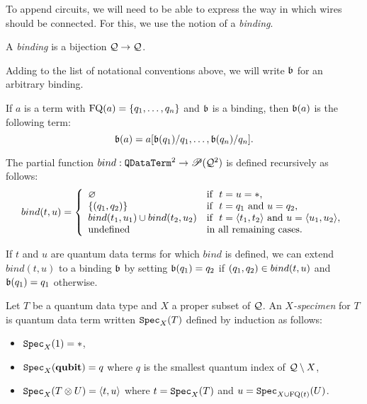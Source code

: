 \documentclass[twoside]{article}
\begin{document}
To append circuits, we will need to be able to express the way in 
which wires should be connected. For this, we use the notion of a 
\emph{binding}.

\begin{definition}
A \emph{binding} is a bijection $\mathcal{Q}\to \mathcal{Q}$.
\end{definition}


Adding to the list of notational conventions above, we will write 
$\mathfrak{b}$ for an arbitrary binding. 

\begin{definition}
If $a$ is a term with $\mathop{\textrm{FQ}}\nolimits(a)=\{q_1,\ldots,q_n\}$ and $\mathfrak{b}$ is 
a binding, then $\mathfrak{b}(a)$ is the following term:
\[
\mathfrak{b}(a)= a[\mathfrak{b}(q_1)/q_1,\ldots ,\mathfrak{b}(q_n)/q_n].
\]
\end{definition}

\begin{definition}
The partial function $bind: \texttt{QDataTerm}^2\to {\mathscr{P}} (\mathcal{Q}^2)$ is 
defined recursively as follows:
\[
bind (t,u)= \left\{
  \begin{array}{ll}
    \varnothing & \mbox{if}~~ t=u=*, \\
    \{(q_1,q_2)\} & \mbox{if}~~ t=q_1 \mbox{ and } u=q_2, \\        
    bind (t_1,u_1) \cup bind (t_2,u_2) & 
      \mbox{if}~~ t=\langle t_1,t_2\rangle \mbox{ and } u=\langle u_1,u_2\rangle, \\
    \mbox{undefined} & \mbox{in all remaining cases.}
  \end{array}
\right.
\]
\end{definition}

\begin{remark}
\label{bind_extension}
If $t$ and $u$ are quantum data terms for which $bind$ is defined, we 
can extend $bind(t,u)$ to a binding $\mathfrak{b}$ by setting 
$\mathfrak{b} (q_1) = q_2$ if $(q_1,q_2)\in bind (t,u)$ and 
$\mathfrak{b} (q_1) = q_1$ otherwise.
\end{remark}

\begin{definition}
Let $T$ be a quantum data type and $X$ a proper subset of $\mathcal{Q}$. 
An \emph{$X$-specimen} for $T$ is quantum data term written $\texttt{Spec}_X(T)$ 
defined by induction as follows:
\begin{itemize}
  \item $\texttt{Spec}_X(1)=*$,
  \item $\texttt{Spec}_X(\textrm{\bf qubit})=q$ where $q$ is the smallest quantum 
  index of $\mathcal{Q}\setminus X$,
  \item $\texttt{Spec}_X(T\otimes U)=\langle t,u\rangle$ where $t=\texttt{Spec}_X(T)$ 
  and $u=\texttt{Spec}_{X\cup \mathop{\textrm{FQ}}\nolimits(t)}(U)$.  
\end{itemize}
\end{definition}
\end{document}
